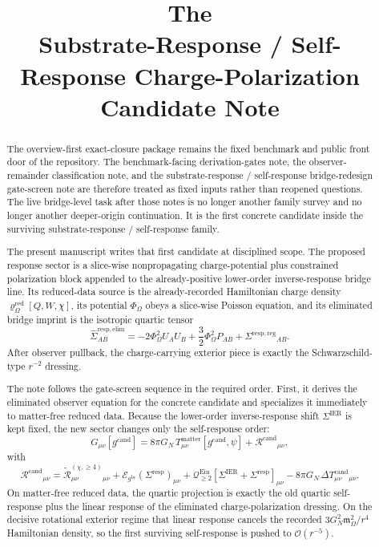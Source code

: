\documentclass[11pt]{article}
\title{\textbf{The \TheoryName{}}\\[0.4em]
\large Substrate-Response / Self-Response Charge-Polarization Candidate Note}
\author{}
\date{}
\newcommand{\ProjSub}{P}
\newcommand{\ObserverMetric}{g^{\mathrm{br}}}
\newcommand{\CandidateMetric}{g^{\mathrm{cand}}}
\newcommand{\BaseShift}{\Sigma^{\mathrm{IER}}}
\newcommand{\ResponseShift}{\Sigma^{\mathrm{resp}}}
\newcommand{\ResponseShiftReg}{\Sigma^{\mathrm{resp,reg}}}
\newcommand{\FlowPot}{\Phi_\Omega}
\newcommand{\SourceDensityRed}{\varrho_\Omega^{\mathrm{red}}}
\newcommand{\HamChargeOmega}{\mathfrak m_\Omega}
\newcommand{\ReLongFour}{\widetilde{\mathcal R}_{\mu\nu}^{(\chi,\ge 4)}}
\newcommand{\DeltaTCand}{\Delta T_{\mu\nu}^{\mathrm{cand}}}
\newcommand{\ObserverRemCand}{\mathcal R^{\mathrm{cand}}}
\newcommand{\EinLin}{\mathcal E_{\ObserverMetric}}
\newcommand{\EinQuad}{\mathcal Q_{\ge 2}^{\mathrm{Ein}}}
\begin{document}
\maketitle

\begin{abstract}
The overview-first exact-closure package remains the fixed benchmark and public front door of the repository. The benchmark-facing derivation-gates note, the observer-remainder classification note, and the substrate-response / self-response bridge-redesign gate-screen note are therefore treated as fixed inputs rather than reopened questions. The live bridge-level task after those notes is no longer another family survey and no longer another deeper-origin continuation. It is the first concrete candidate inside the surviving substrate-response / self-response family.

The present manuscript writes that first candidate at disciplined scope. The proposed response sector is a slice-wise nonpropagating charge-potential plus constrained polarization block appended to the already-positive lower-order inverse-response bridge line. Its reduced-data source is the already-recorded Hamiltonian charge density \(\SourceDensityRed[Q,W,\chi]\), its potential \(\FlowPot\) obeys a slice-wise Poisson equation, and its eliminated bridge imprint is the isotropic quartic tensor
\[
\widehat{\Sigma}^{\mathrm{resp,elim}}_{AB}
=
-2\FlowPot^2U_AU_B
+\frac32\FlowPot^2\ProjSub_{AB}
+\ResponseShiftReg{}_{AB}.
\]
After observer pullback, the charge-carrying exterior piece is exactly the Schwarzschild-type \(r^{-2}\) dressing.

The note follows the gate-screen sequence in the required order. First, it derives the eliminated observer equation for the concrete candidate and specializes it immediately to matter-free reduced data. Because the lower-order inverse-response shift \(\BaseShift\) is kept fixed, the new sector changes only the self-response order:
\[
G_{\mu\nu}[\CandidateMetric]
=
8\pi G_N\,T_{\mu\nu}^{\mathrm{matter}}[\CandidateMetric,\psi]
+\ObserverRemCand{}_{\mu\nu},
\]
with
\[
\ObserverRemCand{}_{\mu\nu}
=
\ReLongFour{}_{\mu\nu}
+\EinLin(\ResponseShift)_{\mu\nu}
+\EinQuad[\BaseShift+\ResponseShift]_{\mu\nu}
-8\pi G_N\,\DeltaTCand{}_{\mu\nu}.
\]
On matter-free reduced data, the quartic projection is exactly the old quartic self-response plus the linear response of the eliminated charge-polarization dressing. On the decisive rotational exterior regime that linear response cancels the recorded \(3G_N^2\HamChargeOmega^2/r^4\) Hamiltonian density, so the first surviving self-response is pushed to \(\mathcal O(r^{-5})\).


\end{abstract}
\end{document}
